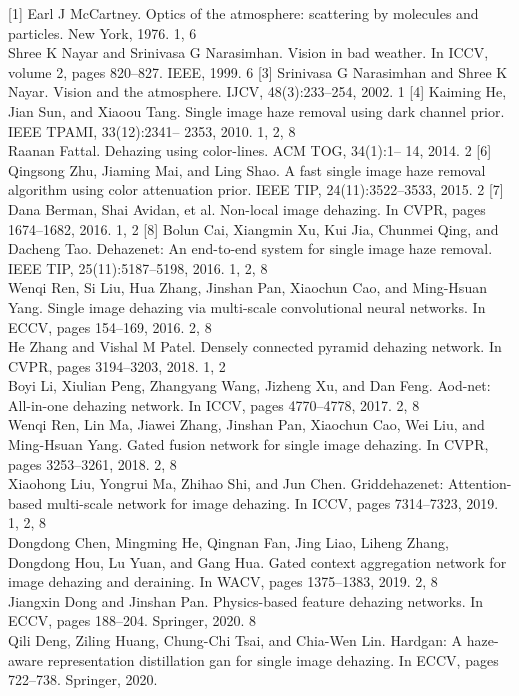 \documentclass{article}
\begin{document}
[1] Earl J McCartney. Optics of the atmosphere: scattering by molecules and particles. New York, 1976. 1, 6\\
[2] Shree K Nayar and Srinivasa G Narasimhan. Vision in bad weather. In ICCV, volume 2, pages 820–827. IEEE, 1999. 6 [3] Srinivasa G Narasimhan and Shree K Nayar. Vision and the atmosphere. IJCV, 48(3):233–254, 2002. 1 [4] Kaiming He, Jian Sun, and Xiaoou Tang. Single image haze removal using dark channel prior. IEEE TPAMI, 33(12):2341– 2353, 2010. 1, 2, 8\\
[5] Raanan Fattal. Dehazing using color-lines. ACM TOG, 34(1):1– 14, 2014. 2 [6] Qingsong Zhu, Jiaming Mai, and Ling Shao. A fast single image haze removal algorithm using color attenuation prior. IEEE TIP, 24(11):3522–3533, 2015. 2 [7] Dana Berman, Shai Avidan, et al. Non-local image dehazing. In CVPR, pages 1674–1682, 2016. 1, 2 [8] Bolun Cai, Xiangmin Xu, Kui Jia, Chunmei Qing, and Dacheng Tao. Dehazenet: An end-to-end system for single image haze removal. IEEE TIP, 25(11):5187–5198, 2016. 1, 2, 8\\
[9] Wenqi Ren, Si Liu, Hua Zhang, Jinshan Pan, Xiaochun Cao, and Ming-Hsuan Yang. Single image dehazing via multi-scale convolutional neural networks. In ECCV, pages 154–169, 2016. 2, 8\\
[10] He Zhang and Vishal M Patel. Densely connected pyramid dehazing network. In CVPR, pages 3194–3203, 2018. 1, 2\\
[11] Boyi Li, Xiulian Peng, Zhangyang Wang, Jizheng Xu, and Dan Feng. Aod-net: All-in-one dehazing network. In ICCV, pages 4770–4778, 2017. 2, 8\\
[12] Wenqi Ren, Lin Ma, Jiawei Zhang, Jinshan Pan, Xiaochun Cao, Wei Liu, and Ming-Hsuan Yang. Gated fusion network for single image dehazing. In CVPR, pages 3253–3261, 2018. 2, 8\\
[13] Xiaohong Liu, Yongrui Ma, Zhihao Shi, and Jun Chen. Griddehazenet: Attention-based multi-scale network for image dehazing. In ICCV, pages 7314–7323, 2019. 1, 2, 8\\
[14] Dongdong Chen, Mingming He, Qingnan Fan, Jing Liao, Liheng Zhang, Dongdong Hou, Lu Yuan, and Gang Hua. Gated context aggregation network for image dehazing and deraining. In WACV, pages 1375–1383, 2019. 2, 8\\
[15] Jiangxin Dong and Jinshan Pan. Physics-based feature dehazing networks. In ECCV, pages 188–204. Springer, 2020. 8\\
[16] Qili Deng, Ziling Huang, Chung-Chi Tsai, and Chia-Wen Lin. Hardgan: A haze-aware representation distillation gan for single image dehazing. In ECCV, pages 722–738. Springer, 2020.\\
\end{document}
